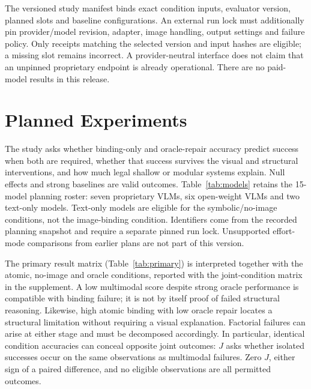 \documentclass[10pt,twocolumn,letterpaper]{article}
\begin{document}
The versioned study manifest binds exact condition inputs, evaluator
version, planned slots and baseline configurations.
An external run lock must additionally pin provider/model revision,
adapter, image handling, output settings and failure policy.
Only receipts matching the selected version and input hashes are
eligible; a missing slot remains incorrect. A provider-neutral
interface does not claim that an unpinned proprietary endpoint is
already operational. There are no paid-model results in this release.

\section{Planned Experiments}
The study asks whether binding-only and oracle-repair accuracy
predict success when both are required, whether that success
survives the visual and structural interventions, and how much
legal shallow or modular systems explain. Null effects and strong
baselines are valid outcomes.
Table~\ref{tab:models} retains the 15-model planning roster:
seven proprietary VLMs, six open-weight VLMs and two text-only
models. Text-only models are eligible for the symbolic/no-image
conditions, not the image-binding condition. Identifiers come from
the recorded planning snapshot and require a separate pinned run lock.
Unsupported effort-mode comparisons from earlier plans are not
part of this version.

\begin{table}[t]
\centering\small
\caption{Planned model inventory and input eligibility. These names
are planning metadata, not completed runs or a live availability
claim. Every unmeasured result is blank.}
\label{tab:models}

\end{table}

\begin{table}[t]
\centering\small
\caption{Primary multimodal results to be collected. Exact requires
correct binding and every optimal repair; Bind is terminal accuracy.
V-change, V-keep and Fault are both-correct paired metrics.
All-six requires every cell of the factorial design correct.
All entries are equal-group percentages; micro scores, intervals,
failure counts and eligible groups accompany the complete records.}
\label{tab:primary}

\end{table}

The primary result matrix (Table~\ref{tab:primary}) is interpreted
together with the atomic, no-image and oracle conditions, reported
with the joint-condition matrix in the supplement.
A low multimodal score despite strong oracle
performance is compatible with binding failure; it is not by itself
proof of failed structural reasoning. Likewise, high atomic binding
with low oracle repair locates a structural limitation without
requiring a visual explanation. Factorial failures can arise at
either stage and must be decomposed accordingly.
In particular, identical condition accuracies can conceal opposite
joint outcomes: $J$ asks whether isolated successes occur on the
same observations as multimodal failures. Zero $J$, either sign
of a paired difference, and no eligible observations are all
permitted outcomes.
\end{document}
